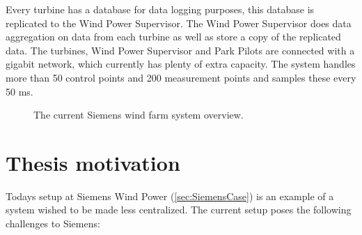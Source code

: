Every turbine has a database for data logging purposes, this database is replicated to the Wind Power Supervisor.
The Wind Power Supervisor does data aggregation on data from each turbine as well as store a copy of the replicated data.
The turbines, Wind Power Supervisor and Park Pilots are connected with a gigabit network, which currently has plenty of extra capacity.
The system handles more than 50 control points and 200 measurement points and samples these every 50 ms.

\begin{figure}
	\centering
	\scalebox{0.7}{}
	\caption[The current Siemens wind farm system overview]{
		\label{fig:currentSiemensSetup} 
		\footnotesize{%
			The current Siemens wind farm system overview.
		}
	}
\end{figure}

%	
%		
%	
%					
%

\section{Thesis motivation}
\label{sec:ThesisMotivation}
Todays setup at Siemens Wind Power (\cref{sec:SiemensCase}) is an example of a system wished to be made less centralized. The current setup poses the following challenges to Siemens:  

